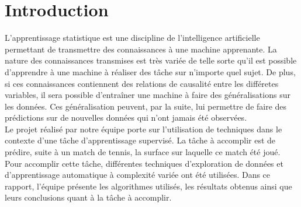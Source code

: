 \section{Introduction}

L'apprentissage statistique est une discipline de l'intelligence artificielle permettant de transmettre des connaissances à une machine apprenante. La nature des connaissances transmises est très variée de telle sorte qu'il est possible d'apprendre à une machine à réaliser des tâche sur n'importe quel sujet. De plus, si ces connaissances contiennent des relations de causalité entre les différetes variables, il sera possible d'entraîner une machine à faire des généralisations sur les données. Ces généralisation peuvent, par la suite, lui permettre de faire des prédictions sur de nouvelles données qui n'ont jamais été observées.\\

Le projet réalisé par notre équipe porte sur l'utilisation de techniques dans le contexte d'une tâche d'apprentissage supervisé. La tâche à accomplir est de prédire, suite à un match de tennis, la surface sur laquelle ce match été joué.  Pour accomplir cette tâche, différentes techniques d'exploration de données et d'apprentissage automatique à complexité variée ont été utilisées.  Dans ce rapport, l'équipe présente les algorithmes utilisés, les résultats obtenus ainsi que leurs conclusions quant à la tâche à accomplir.


